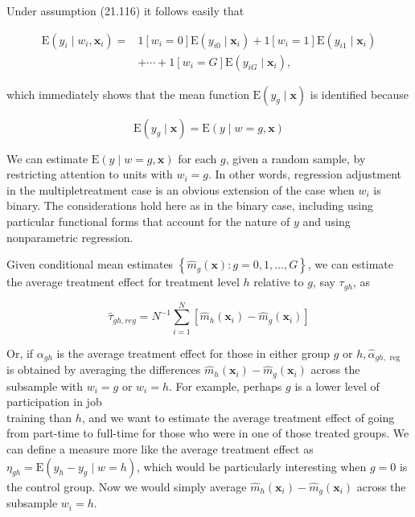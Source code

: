 \documentclass[10pt]{article}
\begin{document}
Under assumption (21.116) it follows easily that


\begin{align*}
\mathrm{E}\left(y_{i} \mid w_{i}, \mathbf{x}_{i}\right)= & 1\left[w_{i}=0\right] \mathrm{E}\left(y_{i 0} \mid \mathbf{x}_{i}\right)+1\left[w_{i}=1\right] \mathrm{E}\left(y_{i 1} \mid \mathbf{x}_{i}\right) \\
& +\cdots+1\left[w_{i}=G\right] \mathrm{E}\left(y_{i G} \mid \mathbf{x}_{i}\right), \tag{21.117}
\end{align*}


which immediately shows that the mean function $\mathrm{E}\left(y_{g} \mid \mathbf{x}\right)$ is identified because


\begin{equation*}
\mathrm{E}\left(y_{g} \mid \mathbf{x}\right)=\mathrm{E}(y \mid w=g, \mathbf{x}) \tag{21.118}
\end{equation*}


We can estimate $\mathrm{E}(y \mid w=g, \mathbf{x})$ for each $g$, given a random sample, by restricting attention to units with $w_{i}=g$. In other words, regression adjustment in the multipletreatment case is an obvious extension of the case when $w_{i}$ is binary. The considerations hold here as in the binary case, including using particular functional forms that account for the nature of $y$ and using nonparametric regression.

Given conditional mean estimates $\left\{\hat{m}_{g}(\mathbf{x}): g=0,1, \ldots, G\right\}$, we can estimate the average treatment effect for treatment level $h$ relative to $g$, say $\tau_{g h}$, as


\begin{equation*}
\hat{\tau}_{g h, r e g}=N^{-1} \sum_{i=1}^{N}\left[\hat{m}_{h}\left(\mathbf{x}_{i}\right)-\hat{m}_{g}\left(\mathbf{x}_{i}\right)\right] \tag{21.119}
\end{equation*}


Or, if $\alpha_{g h}$ is the average treatment effect for those in either group $g$ or $h, \hat{\alpha}_{g h, \text { reg }}$ is obtained by averaging the differences $\hat{m}_{h}\left(\mathbf{x}_{i}\right)-\hat{m}_{g}\left(\mathbf{x}_{i}\right)$ across the subsample with $w_{i}=g$ or $w_{i}=h$. For example, perhaps $g$ is a lower level of participation in job\\
training than $h$, and we want to estimate the average treatment effect of going from part-time to full-time for those who were in one of those treated groups. We can define a measure more like the average treatment effect as $\eta_{g h}=\mathrm{E}\left(y_{h}-y_{g} \mid w=h\right)$, which would be particularly interesting when $g=0$ is the control group. Now we would simply average $\hat{m}_{h}\left(\mathbf{x}_{i}\right)-\hat{m}_{g}\left(\mathbf{x}_{i}\right)$ across the subsample $w_{i}=h$.
\end{document}
